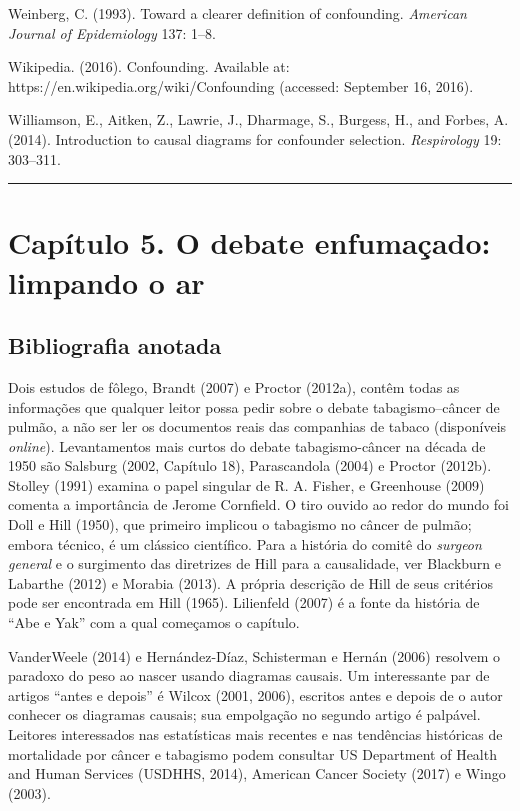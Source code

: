 \documentclass[11pt,a5paper,twoside]{book}
\begin{document}
Weinberg, C. (1993). Toward a clearer definition of confounding. \textit{American Journal of Epidemiology} 137: 1–8.

Wikipedia. (2016). Confounding. Available at: https://en.wikipedia.org/wiki/Confounding (accessed: September 16, 2016).

Williamson, E., Aitken, Z., Lawrie, J., Dharmage, S., Burgess, H., and Forbes, A. (2014). Introduction to causal diagrams for confounder selection. \textit{Respirology} 19: 303–311.

\vspace{1em}\hrule\vspace{1em}
\section{Capítulo 5. O debate enfumaçado: limpando o ar}
\subsection{Bibliografia anotada}
Dois estudos de fôlego, Brandt (2007) e Proctor (2012a), contêm todas as informações que qualquer leitor possa pedir sobre o debate tabagismo–câncer de pulmão, a não ser ler os documentos reais das companhias de tabaco (disponíveis \textit{online}). Levantamentos mais curtos do debate tabagismo-câncer na década de 1950 são Salsburg (2002, Capítulo 18), Parascandola (2004) e Proctor (2012b). Stolley (1991) examina o papel singular de R. A. Fisher, e Greenhouse (2009) comenta a importância de Jerome Cornfield. O tiro ouvido ao redor do mundo foi Doll e Hill (1950), que primeiro implicou o tabagismo no câncer de pulmão; embora técnico, é um clássico científico. Para a história do comitê do \textit{surgeon general} e o surgimento das diretrizes de Hill para a causalidade, ver Blackburn e Labarthe (2012) e Morabia (2013). A própria descrição de Hill de seus critérios pode ser encontrada em Hill (1965). Lilienfeld (2007) é a fonte da história de “Abe e Yak” com a qual começamos o capítulo.

VanderWeele (2014) e Hernández-Díaz, Schisterman e Hernán (2006) resolvem o paradoxo do peso ao nascer usando diagramas causais. Um interessante par de artigos “antes e depois” é Wilcox (2001, 2006), escritos antes e depois de o autor conhecer os diagramas causais; sua empolgação no segundo artigo é palpável. Leitores interessados nas estatísticas mais recentes e nas tendências históricas de mortalidade por câncer e tabagismo podem consultar US Department of Health and Human Services (USDHHS, 2014), American Cancer Society (2017) e Wingo (2003).
\end{document}
